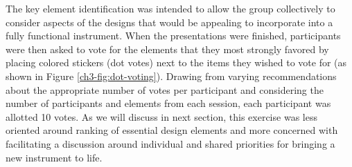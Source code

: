 \documentclass[letterpaper, 12pt]{article}
\begin{document}
The key element identification was intended to allow the group collectively to consider aspects of the designs that would be appealing to incorporate into a fully functional instrument. When the presentations were finished, participants were then asked to vote for the elements that they most strongly favored by placing colored stickers (dot votes) next to the items they wished to vote for (as shown in Figure \ref{ch3-fig:dot-voting}). 
Drawing from varying recommendations about the appropriate number of votes per participant \citep{Gray2010, Gibbons2019} and considering the number of participants and elements from each session, each participant was allotted 10 votes. As we will discuss in next section, this exercise was less oriented around ranking of essential design elements and more concerned with facilitating a discussion around individual and shared priorities for bringing a new instrument to life. 
\end{document}
